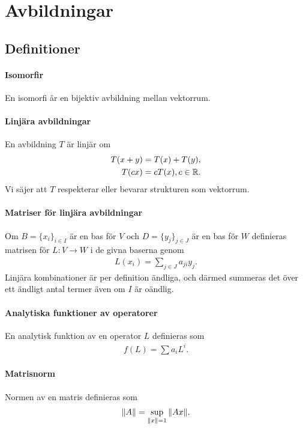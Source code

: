 \section{Avbildningar}

\subsection{Definitioner}

\paragraph{Isomorfir}
En isomorfi är en bijektiv avbildning mellan vektorrum.

\paragraph{Linjära avbildningar}
En avbildning $T$ är linjär om
\begin{align*}
	T(x + y) = T(x) + T(y), \\
	T(cx) = cT(x), c\in\mathbb{R}.
\end{align*}
Vi säjer att $T$ respekterar eller bevarar strukturen som vektorrum.

\paragraph{Matriser för linjära avbildningar}
Om $B = \{x_{i}\}_{i\in I}$ är en bas för $V$ och $D = \{y_{j}\}_{j\in J}$ är en bas för $W$ definieras matrisen för $L: V\to W$ i de givna baserna genom
\begin{align*}
	L(x_{i}) = \sum\limits_{j\in J}a_{ji}y_{j}.
\end{align*}
Linjära kombinationer är per definition ändliga, och därmed summeras det över ett ändligt antal termer även om $I$ är oändlig.

\paragraph{Analytiska funktioner av operatorer}
En analytisk funktion av en operator $L$ definieras som
\begin{align*}
	f(L) = \sum a_{i}L^{i}.
\end{align*}

\paragraph{Matrisnorm}
Normen av en matris definieras som
\begin{align*}
	\norm{A} = \sup\limits_{\norm{x} = 1}\norm{Ax}.
\end{align*}

